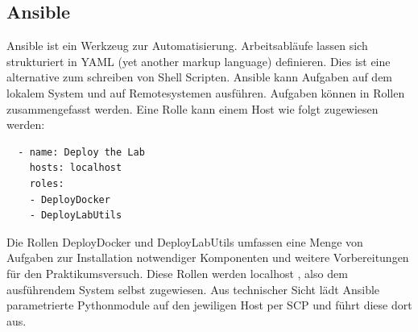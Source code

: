 \subsection{Ansible}

Ansible ist ein Werkzeug zur Automatisierung. Arbeitsabläufe lassen sich strukturiert in YAML (yet another markup language) definieren. Dies ist eine alternative zum schreiben
von Shell Scripten. Ansible kann Aufgaben auf dem lokalem 
System und auf Remotesystemen ausführen. Aufgaben können in Rollen zusammengefasst werden.  
Eine Rolle kann einem Host wie folgt zugewiesen werden:
\begin{lstlisting}
  - name: Deploy the Lab
    hosts: localhost
    roles:
    - DeployDocker
    - DeployLabUtils
\end{lstlisting}

Die Rollen \grqq DeployDocker \grqq{} und \grqq DeployLabUtils \grqq{} umfassen eine Menge von Aufgaben zur Installation notwendiger Komponenten und weitere Vorbereitungen
für den Praktikumsversuch. Diese Rollen werden \grqq localhost \grqq{}, also dem ausführendem System selbst zugewiesen.
Aus technischer Sicht lädt Ansible parametrierte Pythonmodule auf den jewiligen Host per SCP und führt diese dort aus.


